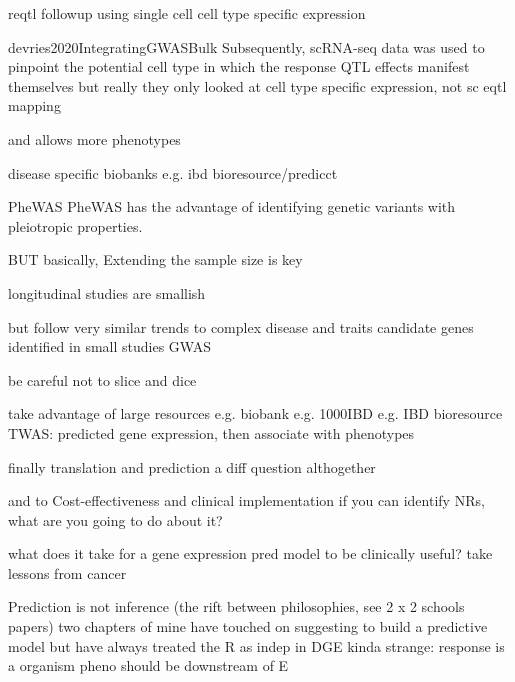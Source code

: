 \begin{outline}
        reqtl followup using single cell cell type specific expression

        devries2020IntegratingGWASBulk
        Subsequently, scRNA-seq data was used to pinpoint the potential cell type in which the response QTL effects manifest themselves
            but really they only looked at cell type specific expression, not sc eqtl mapping

and allows
more phenotypes
        
        disease specific biobanks e.g. ibd bioresource/predicct


    PheWAS\autocite{verma2017CurrentScopeChallenges}
    PheWAS has the advantage of identifying genetic variants with pleiotropic properties.

BUT basically, Extending the sample size is key

    longitudinal studies are smallish

    but follow very similar trends to complex disease and traits
        candidate genes identified in small studies
        GWAS

    be careful not to slice and dice

    take advantage of large resources
    e.g. biobank
    e.g. 1000IBD
    e.g. IBD bioresource
        TWAS: predicted gene expression, then associate with phenotypes

finally translation and prediction
    a diff question althogether

    and to Cost-effectiveness and clinical implementation
        if you can identify NRs, what are you going to do about it?

        what does it take for a gene expression pred model to be clinically useful?
            take lessons from cancer

    Prediction is not inference (the rift between philosophies, see 2 x 2 schools papers)
        two chapters of mine
            have touched on suggesting to build a predictive model
        but have always treated the R as indep in DGE
        kinda strange: response is a organism pheno should be downstream of E


\end{outline}
